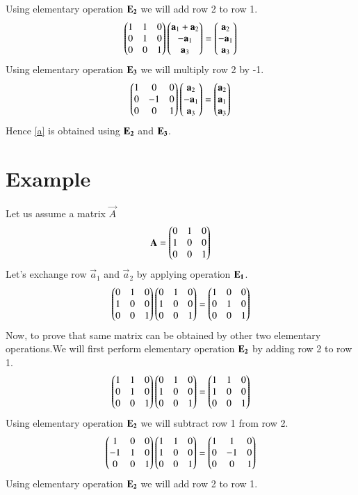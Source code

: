 \documentclass[journal,12pt,twocolumn]{IEEEtran}
\begin{document}
  Using elementary operation $\bf{E}_2$ we will add row 2 to row 1.
   \begin{align}
    \begin{pmatrix}1&1&0\\0&1&0\\0&0&1\end{pmatrix} \begin{pmatrix}\mathbf{a}_1+\mathbf{a}_2\\-\mathbf{a}_1\\\mathbf{a}_3\end{pmatrix}=
  \begin{pmatrix}\mathbf{a}_2\\-\mathbf{a}_1\\\mathbf{a}_3\end{pmatrix}
  \end{align}
  Using elementary operation $\bf{E}_3$ we will multiply row 2 by -1.
   \begin{align}
   \begin{pmatrix}1&0&0\\0&-1&0\\0&0&1\end{pmatrix}\begin{pmatrix}\mathbf{a}_2\\-\mathbf{a}_1\\\mathbf{a}_3\end{pmatrix}=
  \begin{pmatrix}\mathbf{a}_2\\\mathbf{a}_1\\\mathbf{a}_3\end{pmatrix}
  \end{align}
  Hence \eqref{a} is obtained using $\bf{E}_2$ and $\bf{E}_3$.
  \section{\textbf{Example}}
  Let us assume a matrix $\vec{A}$  
 \begin{align}
 \mathbf{A}=\begin{pmatrix}0&1&0\\1&0&0\\0&0&1\end{pmatrix}
  \end{align}
 Let's exchange row $\vec{a}_1$ and $\vec{a}_2$ by applying operation $\bf{E}_1$.
 \begin{align}
 \begin{pmatrix}0&1&0\\1&0&0\\0&0&1\end{pmatrix}\begin{pmatrix}0&1&0\\1&0&0\\0&0&1\end{pmatrix}=
\begin{pmatrix}1&0&0\\0&1&0\\0&0&1\end{pmatrix}\label{B}
 \end{align}
 Now, to prove that same matrix can be obtained by other two elementary operations.We will first perform elementary operation $\bf{E}_2$ by adding row 2 to row 1.
 \begin{align}
  \begin{pmatrix}1&1&0\\0&1&0\\0&0&1\end{pmatrix}\begin{pmatrix}0&1&0\\1&0&0\\0&0&1\end{pmatrix}=
\begin{pmatrix}1&1&0\\1&0&0\\0&0&1\end{pmatrix}
 \end{align}
 Using elementary operation $\bf{E}_2$ we will subtract row 1 from row 2.
  \begin{align}
   \begin{pmatrix}1&0&0\\-1&1&0\\0&0&1\end{pmatrix}\begin{pmatrix}1&1&0\\1&0&0\\0&0&1\end{pmatrix}=
 \begin{pmatrix}1&1&0\\0&-1&0\\0&0&1\end{pmatrix}
 \end{align}
 Using elementary operation $\bf{E}_2$ we will add row 2 to row 1.
   
\end{document}
